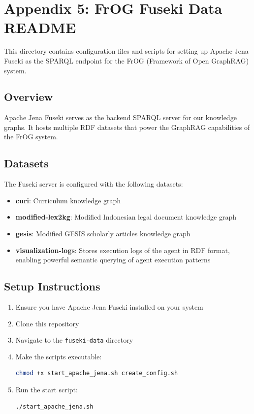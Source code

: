 \chapter*{Appendix 5: FrOG Fuseki Data README}
\label{sec:frog-fuseki-readme}

This directory contains configuration files and scripts for setting up Apache Jena Fuseki as the SPARQL endpoint for the FrOG (Framework of Open GraphRAG) system.

\section*{Overview}

Apache Jena Fuseki serves as the backend SPARQL server for our knowledge graphs. It hosts multiple RDF datasets that power the GraphRAG capabilities of the FrOG system.

\section*{Datasets}

The Fuseki server is configured with the following datasets:

\begin{itemize}
    \item \textbf{curi}: Curriculum knowledge graph
    \item \textbf{modified-lex2kg}: Modified Indonesian legal document knowledge graph
    \item \textbf{gesis}: Modified GESIS scholarly articles knowledge graph
    \item \textbf{visualization-logs}: Stores execution logs of the agent in RDF format, enabling powerful semantic querying of agent execution patterns
\end{itemize}

\section*{Setup Instructions}

\begin{enumerate}
    \item Ensure you have Apache Jena Fuseki installed on your system
    \item Clone this repository
    \item Navigate to the \texttt{fuseki-data} directory
    \item Make the scripts executable:
    \begin{lstlisting}[language=bash]
chmod +x start_apache_jena.sh create_config.sh
    \end{lstlisting}
    \item Run the start script:
    \begin{lstlisting}[language=bash]
./start_apache_jena.sh
    \end{lstlisting}
\end{enumerate}

